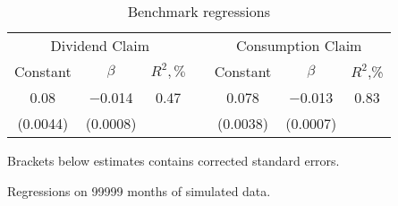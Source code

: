 \begin{table}[H]
 \centering
   \caption{Benchmark regressions}           
   \label{tab:regress1}
 \begin{threeparttable}
 \begin{tabular}{@{}ccccccc@{}}
 \toprule
   \multicolumn{3}{c}{Dividend Claim} && \multicolumn{3}{c}{Consumption Claim} \\ 
 \addlinespace
 Constant  & $\beta$  &  $R^2,\%$     && Constant & $\beta$   &  $R^2$,\%      \\
 \cmidrule(lr){1-3} \cmidrule(lr){5-7}
 0.08      & $-$0.014 & 0.47          && 0.078    & $-$0.013  & 0.83           \\ 
 \addlinespace
 (0.0044)  & (0.0008) &               && (0.0038) & (0.0007)  &                \\
 \bottomrule
 \end{tabular}
 \begin{tablenotes}\footnotesize{
 \item[1] Brackets below estimates contains \citet{NW87} corrected standard errors. 
 \item[2] Regressions on 99999 months of simulated data.
 }
 \end{tablenotes}
 \end{threeparttable}
 \end{table}